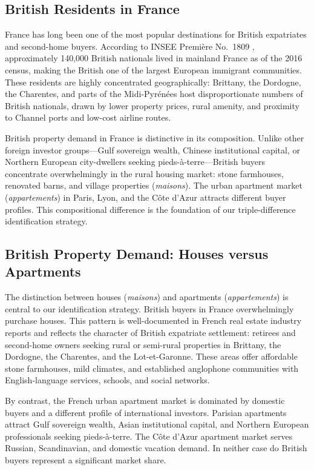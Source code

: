 \documentclass[12pt]{article}
\begin{document}
\subsection{British Residents in France}

France has long been one of the most popular destinations for British expatriates and second-home buyers. According to INSEE Premi\`ere No.\ 1809 \citep{insee2019premiere}, approximately 140,000 British nationals lived in mainland France as of the 2016 census, making the British one of the largest European immigrant communities. These residents are highly concentrated geographically: Brittany, the Dordogne, the Charentes, and parts of the Midi-Pyr\'en\'ees host disproportionate numbers of British nationals, drawn by lower property prices, rural amenity, and proximity to Channel ports and low-cost airline routes.

British property demand in France is distinctive in its composition. Unlike other foreign investor groups---Gulf sovereign wealth, Chinese institutional capital, or Northern European city-dwellers seeking pieds-\`a-terre---British buyers concentrate overwhelmingly in the rural housing market: stone farmhouses, renovated barns, and village properties (\textit{maisons}). The urban apartment market (\textit{appartements}) in Paris, Lyon, and the C\^ote d'Azur attracts different buyer profiles. This compositional difference is the foundation of our triple-difference identification strategy.

\subsection{British Property Demand: Houses versus Apartments}

The distinction between houses (\textit{maisons}) and apartments (\textit{appartements}) is central to our identification strategy. British buyers in France overwhelmingly purchase houses. This pattern is well-documented in French real estate industry reports and reflects the character of British expatriate settlement: retirees and second-home owners seeking rural or semi-rural properties in Brittany, the Dordogne, the Charentes, and the Lot-et-Garonne. These areas offer affordable stone farmhouses, mild climates, and established anglophone communities with English-language services, schools, and social networks.

By contrast, the French urban apartment market is dominated by domestic buyers and a different profile of international investors. Parisian apartments attract Gulf sovereign wealth, Asian institutional capital, and Northern European professionals seeking pieds-\`a-terre. The C\^ote d'Azur apartment market serves Russian, Scandinavian, and domestic vacation demand. In neither case do British buyers represent a significant market share.
\end{document}

